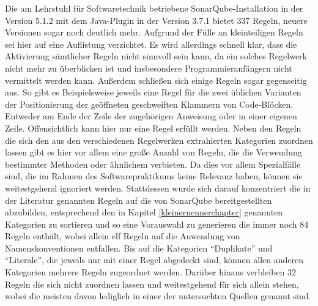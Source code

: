 \documentclass[da,ngerman]{stthesis}
\begin{document}
			Die am Lehrstuhl für Softwaretechnik betriebene SonarQube-Installation in der Version 5.1.2 mit dem Java-Plugin in der Version 3.7.1 bietet 337 Regeln, neuere Versionen sogar noch deutlich mehr. Aufgrund der Fülle an kleinteiligen Regeln sei hier auf eine Auflistung verzichtet. Es wird allerdings schnell klar, dass die Aktivierung sämtlicher Regeln nicht sinnvoll sein kann, da ein solches Regelwerk nicht mehr zu überblicken ist und insbesondere Programmieranfängern nicht vermittelt werden kann. Außerdem schließen sich einige Regeln sogar gegenseitig aus. So gibt es Beispielsweise jeweils eine Regel für die zwei üblichen Varianten der Positionierung der geöffneten geschweiften Klammern von Code-Blöcken. Entweder am Ende der Zeile der zugehörigen Anweisung oder in einer eigenen Zeile. Offensichtlich kann hier nur eine Regel erfüllt werden. Neben den Regeln die sich den aus den verschiedenen Regelwerken extrahierten Kategorien zuordnen lassen gibt es hier vor allem eine große Anzahl von Regeln, die die Verwendung bestimmter Methoden oder ähnlichem verbieten. Da dies vor allem Spezialfälle sind, die im Rahmen des Softwarepraktikums keine Relevanz haben, können sie weitestgehend ignoriert werden. \newline
			Stattdessen wurde sich darauf konzentriert die in der Literatur genannten Regeln auf die von SonarQube bereitgestellten abzubilden, entsprechend den in Kapitel \ref{kleinernennerchapter} genannten Kategorien zu sortieren und so eine Vorauswahl zu generieren die immer noch 84 Regeln enthält, wobei allein elf Regeln auf die Anwendung von Namenskonventionen entfallen. Bis auf die Kategorien "`Duplikate"' und "`Literale"', die jeweils nur mit einer Regel abgedeckt sind, können allen anderen Kategorien mehrere Regeln zugeordnet werden. Darüber hinaus verbleiben 32 Regeln die sich nicht zuordnen lassen und weitestgehend für sich allein stehen, wobei die meisten davon lediglich in einer der untersuchten Quellen genannt sind.\newline
\end{document}
